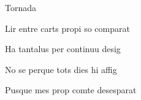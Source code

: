 \documentclass[12pt]{article}
\begin{document}
\begin{estrofaExtra}%




\begin{tornada}

\pagina{[62]}   \textsection{} Tornada

\end{tornada}


\end{estrofaExtra}


\begin{estrofa}

 Lir entre carts propi so comparat

 Ha tantalus per continuu desig

 No se perque tots dies hi affig

 Pusque mes prop comte desesparat

\end{estrofa}
\end{document}
